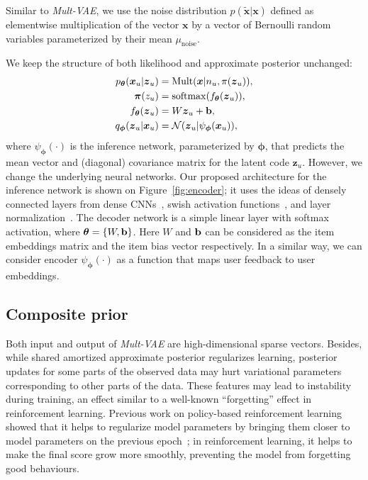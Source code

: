 \documentclass[sigconf,authorversion]{acmart}
\def\bz{{\bf z}}
\def\bb{{\bf b}}
\def\btheta{{\boldsymbol{\theta}}}
\def\bphi{{\boldsymbol{\phi}}}
\def\bpi{{\boldsymbol{\pi}}}
\def\bz{\boldsymbol{z}}
\def\bx{\boldsymbol{x}}
\begin{document}
Similar to \emph{Mult-VAE}, we use the noise distribution $p(\tilde{\bx}|\bx)$ defined as elementwise multiplication of the vector $\bx$ by a vector of Bernoulli random variables parameterized by their mean $\mu_{\mathrm{noise}}$.

We keep the structure of both likelihood and approximate posterior unchanged: 
\begin{align}
p_{\btheta}(\bx_u|\bz_u) &= \mathrm{Mult}(\bx|n_u,\pi(\bz_u)), \\
\bpi(z_u) &=\mathrm{softmax}(f_{\btheta}(\bz_u)), \\
f_{\btheta}(\bz_u) &= W\bz_u+\bb, \\
q_{\bphi}(\bz_u|\bx_u) &= \mathcal{N}(\bz_u|\psi_\bphi(\bx_u)),
\end{align}
where $\psi_\bphi(\cdot)$ is the inference network, parameterized by $\bphi$, that predicts the mean vector and (diagonal) covariance matrix for the latent code $\bz_u$. However, we change the underlying neural networks. Our proposed architecture for the inference network is shown on Figure~\ref{fig:encoder}; it uses the ideas of densely connected layers from dense CNNs~\cite{DBLP:journals/corr/HuangLW16a}, swish activation functions~\cite{DBLP:conf/iclr/RamachandranZL18}, and layer normalization~\cite{2016arXiv160706450L}. The decoder network is a simple linear layer with softmax activation, where ${\btheta}=\{W, \bb\}$.
Here $W$ and $\bb$ can be considered as the item embeddings matrix and the item bias vector respectively. In a similar way, we can consider encoder $\psi_\bphi(\cdot)$ as a function that maps user feedback to user embeddings.

\subsection{Composite prior}\label{sec:prior}

Both input and output of \emph{Mult-VAE} are high-dimensional sparse vectors. Besides, while shared amortized approximate posterior regularizes learning, posterior updates for some parts of the observed data may hurt variational parameters corresponding to other parts of the data. These features may lead to instability during training, an effect similar to a well-known ``forgetting'' effect in reinforcement learning.  Previous work on policy-based reinforcement learning showed that it helps to regularize model parameters by bringing them closer to model parameters on the previous epoch~\cite{DBLP:journals/corr/SchulmanWDRK17,houthooft2016vime}; in reinforcement learning, it helps to make the final score grow more smoothly, preventing the model from forgetting good behaviours.
\end{document}
